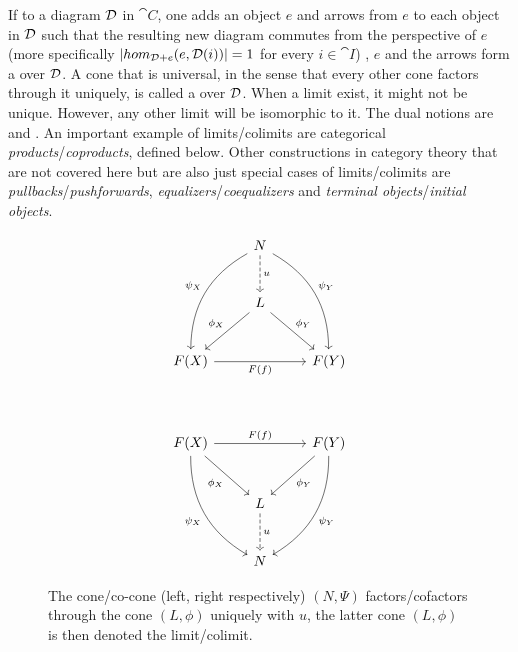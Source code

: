 \documentclass[../../main.tex]{subfiles}
\begin{document}
    If to a diagram $\mathcal{D}$ in $\cat{C}$, one adds an object $e$ and arrows from $e$ to each object in $\mathcal{D}$ such that the resulting new diagram commutes from the perspective of $e$(more specifically $|hom_{\mathcal{D}+e}(e, \mathcal{D}(i))| = 1$ for every $i \in \cat{I}$) , $e$ and the arrows form a  over $\mathcal{D}$. A cone that is universal, in the sense that every other cone factors through it uniquely, is called a  over $\mathcal{D}$. When a limit exist, it might not be unique. However, any other limit will be isomorphic to it. The dual notions are  and . An important example of limits/colimits are categorical \emph{products}/\emph{coproducts}, defined below. Other constructions in category theory that are not covered here but are also just special cases of limits/colimits are \emph{pullbacks}/\emph{pushforwards}, \emph{equalizers}/\emph{coequalizers} and \emph{terminal objects}/\emph{initial objects}.
    
    \begin{figure}[H]
        \centering
        \begin{subfigure}[b]{0.5\textwidth}
            \[
                \begin{tikzcd}[row sep = large]
                    & N \arrow[d, "u",dashed] \arrow[ddr, bend left,"\psi_Y"]   \arrow[ddl, bend right,"\psi_X",swap] & \\
                    & L \arrow[dr, "\phi_Y"]  \arrow[dl,swap, "\phi_X"] & \\
                    F(X) \arrow[rr,swap, "F(f)"] & &  F(Y)
                \end{tikzcd}
            \]
        \end{subfigure}%
        ~
        \begin{subfigure}[b]{0.5\textwidth}
            \[
                \begin{tikzcd}[row sep = large]
                    F(X) \arrow[ddr,swap,"\psi_X",bend right] \arrow[dr,swap,"\phi_X"] \arrow[rr, "F(f)"] & &  F(Y) \arrow[dl,"\phi_Y"] \arrow[ddl,"\psi_Y",bend left]\\
                    & L \arrow[d,"u",dashed] \\
                    & N
                \end{tikzcd}
          \]
        \end{subfigure}
        \caption{The cone/co-cone (left, right respectively) $(N,\Psi)$ factors/cofactors through the cone $(L,\phi)$ uniquely with $u$, the latter cone $(L,\phi)$ is then denoted the limit/colimit.}
    \end{figure}
    
\end{document}
